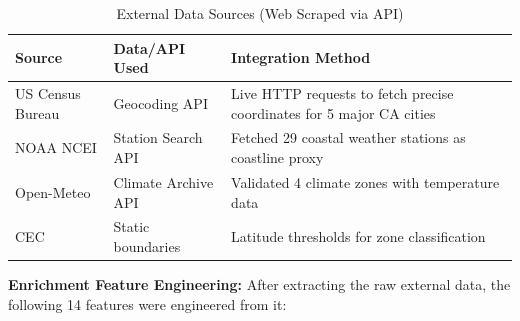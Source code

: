\documentclass[12pt,a4paper]{article}
\begin{document}
\begin{table}[H]
\centering
\caption{External Data Sources (Web Scraped via API)}
\footnotesize
\begin{tabular}{p{2.8cm}p{3.8cm}p{7.5cm}}
\toprule
\textbf{Source} & \textbf{Data/API Used} & \textbf{Integration Method} \\
\midrule
US Census Bureau & Geocoding API & Live HTTP requests to fetch precise coordinates for 5 major CA cities \\
NOAA NCEI & Station Search API & Fetched 29 coastal weather stations as coastline proxy \\
Open-Meteo & Climate Archive API & Validated 4 climate zones with temperature data \\
CEC & Static boundaries & Latitude thresholds for zone classification \\
\bottomrule
\end{tabular}
\end{table}

\textbf{Enrichment Feature Engineering:} After extracting the raw external data, the following 14 features were engineered from it:
\end{document}
